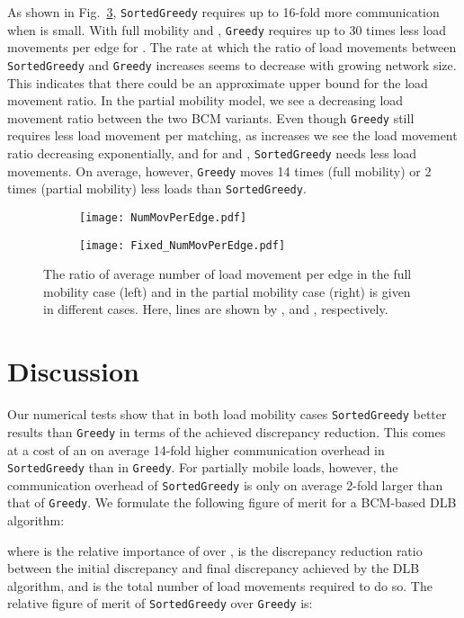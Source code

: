 \documentclass[12pt,psfig,a4]{article}
\newcommand{\sg}{\texttt{SortedGreedy}}
\newcommand{\gr}{\texttt{Greedy}}
\theoremstyle{plain}
\begin{document}
As shown in Fig.~\ref{fig:movePerEdge}, \sg{} requires up to 16-fold more communication when  is small. With full mobility and , \gr{} requires up to 30 times less load movements per edge for . The rate at which the ratio of load movements between \sg{} and \gr{} increases seems to decrease with growing network size. This indicates that there could be an approximate upper bound for the load movement ratio. In the partial mobility model, we see a decreasing load movement ratio between the two BCM variants. Even though \gr{} still requires less load movement per matching, as  increases we see the load movement ratio decreasing exponentially, and for  and , \sg{} needs less load movements. On average, however, \gr{} moves 14 times (full mobility) or 2 times (partial mobility) less loads than \sg{}.


\begin{figure}
\centering	
	\begin{subfigure}[b]{0.45\textwidth}	
		\centering
	      	\texttt{[image: NumMovPerEdge.pdf]}
\label{fig:NumMovPerEdge}
	\end{subfigure}
	\begin{subfigure}[b]{0.45\textwidth}	
		\centering
	      	\texttt{[image: Fixed\_NumMovPerEdge.pdf]}
\label{fig:Fixed_NumMovPerEdge}
	\end{subfigure}
	\caption{The ratio of average number of load movement per edge  in the full mobility case (left) and in the partial mobility case (right) is given in different  cases. Here,  lines are shown by ,  and , respectively. } 
	\label{fig:movePerEdge}
\end{figure}

\section{Discussion}
\label{sec:discussion}
Our numerical tests show that in both load mobility cases \sg{} better results than \gr{} in terms of the achieved discrepancy reduction. This comes at a cost of an on average 14-fold higher communication overhead in \sg{} than in \gr{}. For partially mobile loads, however, the communication overhead of \sg{} is only on average 2-fold larger than that of \gr{}. We formulate the following figure of merit for a BCM-based DLB algorithm:

where  is the relative importance of  over ,  is the discrepancy reduction ratio between the initial discrepancy and final discrepancy achieved by the DLB algorithm, and  is the total number of load movements required to do so. The relative figure of merit  of \sg{} over \gr{} is:
\end{document}
